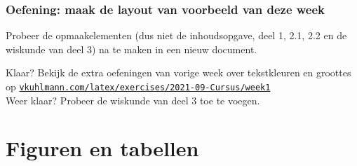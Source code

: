\documentclass{cursuspresentatie}
\begin{document}
\begin{frame}
	\frametitle{Oefening: maak de layout van voorbeeld van deze week}
	Probeer de opmaakelementen (dus niet de inhoudsopgave, deel 1, 2.1,  2.2 en de wiskunde van deel 3) na te maken in een nieuw document.
    
    
	Klaar? Bekijk de extra oefeningen van vorige week over tekstkleuren en
	groottes op
	\href{https://vkuhlmann.com/latex/exercises/2021-09-Cursus/week1}{\nolinkurl{vkuhlmann.com/latex/exercises/2021-09-Cursus/week1}}\\
	Weer klaar? Probeer de wiskunde van deel 3 toe te voegen.
	
\end{frame}

\section{Figuren en tabellen}
\end{document}
